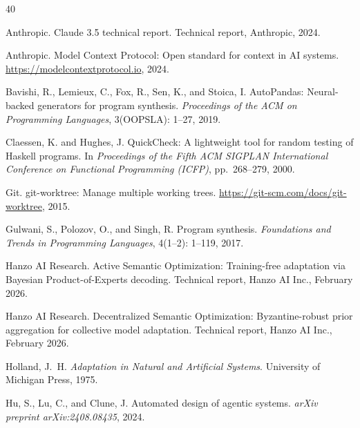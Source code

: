 \documentclass[11pt]{article}
\begin{document}

\begin{thebibliography}{40}

Anthropic.
\newblock Claude 3.5 technical report.
\newblock Technical report, Anthropic, 2024.

Anthropic.
\newblock Model Context Protocol: Open standard for context in AI systems.
\newblock \url{https://modelcontextprotocol.io}, 2024.

Bavishi, R., Lemieux, C., Fox, R., Sen, K., and Stoica, I.
\newblock AutoPandas: Neural-backed generators for program synthesis.
\newblock \textit{Proceedings of the ACM on Programming Languages}, 3(OOPSLA):
  1--27, 2019.

Claessen, K. and Hughes, J.
\newblock QuickCheck: A lightweight tool for random testing of Haskell programs.
\newblock In \textit{Proceedings of the Fifth ACM SIGPLAN International
  Conference on Functional Programming (ICFP)}, pp.\ 268--279, 2000.

Git.
\newblock git-worktree: Manage multiple working trees.
\newblock \url{https://git-scm.com/docs/git-worktree}, 2015.

Gulwani, S., Polozov, O., and Singh, R.
\newblock Program synthesis.
\newblock \textit{Foundations and Trends in Programming Languages}, 4(1--2):
  1--119, 2017.

Hanzo AI Research.
\newblock Active Semantic Optimization: Training-free adaptation via Bayesian
  Product-of-Experts decoding.
\newblock Technical report, Hanzo AI Inc., February 2026.

Hanzo AI Research.
\newblock Decentralized Semantic Optimization: Byzantine-robust prior
  aggregation for collective model adaptation.
\newblock Technical report, Hanzo AI Inc., February 2026.

Holland, J.~H.
\newblock \textit{Adaptation in Natural and Artificial Systems}.
\newblock University of Michigan Press, 1975.

Hu, S., Lu, C., and Clune, J.
\newblock Automated design of agentic systems.
\newblock \textit{arXiv preprint arXiv:2408.08435}, 2024.


\end{thebibliography}
\end{document}
